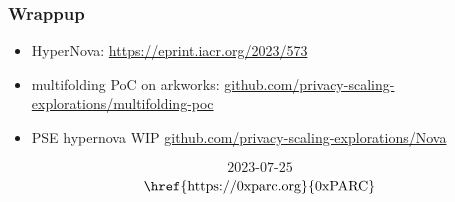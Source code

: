 \documentclass{beamer}
\begin{document}
\begin{frame}
\frametitle{Wrappup}
\begin{itemize}
  \item HyperNova: \href{https://eprint.iacr.org/2023/573}{https://eprint.iacr.org/2023/573}
  \item multifolding PoC on arkworks: \href{https://github.com/privacy-scaling-explorations/multifolding-poc}{github.com/privacy-scaling-explorations/multifolding-poc}
  \item PSE hypernova WIP \href{https://github.com/privacy-scaling-explorations/Nova}{github.com/privacy-scaling-explorations/Nova}
\end{itemize}

\vspace{2cm}
\tiny{
  $$\text{2023-07-25}$$
  $$\text{\href{https://0xparc.org}{0xPARC}}$$
}
\end{frame}





\end{document}
